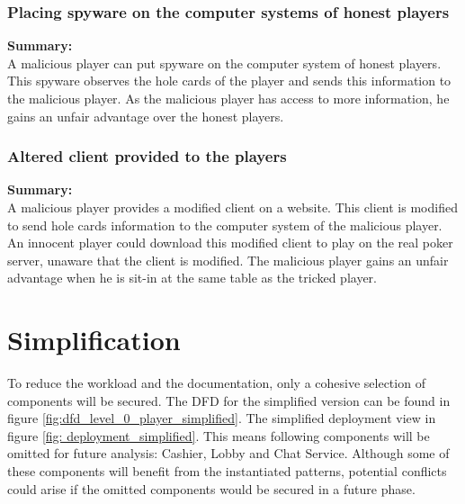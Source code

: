 \documentclass[a4paper,11pt]{report}
\begin{document}
\subsubsection{Placing spyware on the computer systems of honest players}
\textbf{Summary:} \\
A malicious player can put spyware on the computer system of honest players. This spyware observes the hole cards of the player and sends this information to the malicious player. As the malicious player has access to more information, he gains an unfair advantage over the honest players.

\subsubsection{Altered client provided to the players}
\textbf{Summary:} \\
A malicious player provides a modified client on a website. This client is modified to send hole cards information to the computer system of the malicious player. An innocent player could download this modified client to play on the real poker server, unaware that the client is modified. The malicious player gains an unfair advantage when he is sit-in at the same table as the tricked player.

\section{Simplification}
To reduce the workload and the documentation, only a cohesive selection of components will be secured. The DFD for the simplified version can be found in figure \ref{fig:dfd_level_0_player_simplified}. The simplified deployment view in figure \ref{fig: deployment_simplified}.
This means following components will be omitted for future analysis: Cashier, Lobby and Chat Service. Although some of these components will benefit from the instantiated patterns, potential conflicts could arise if the omitted components would be secured in a future phase.
\end{document}
